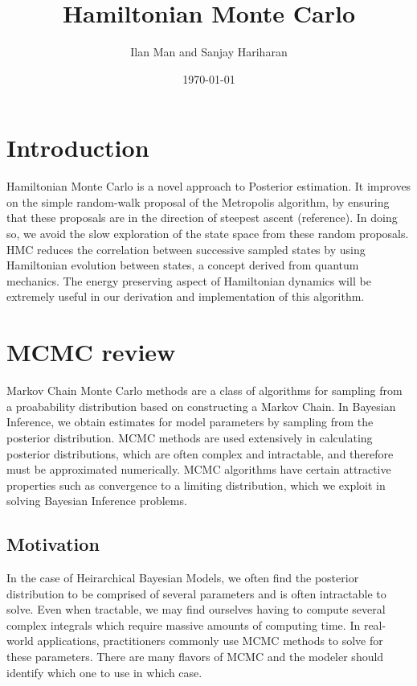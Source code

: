 \documentclass{article}
\title{Hamiltonian Monte Carlo}
\author{Ilan Man and Sanjay Hariharan}
\date{\today}
\begin{document}
\maketitle

\section{Introduction}


Hamiltonian Monte Carlo is a novel approach to Posterior estimation. It improves on the simple random-walk proposal of the Metropolis algorithm, by ensuring that these proposals are in the direction of steepest ascent (reference). In doing so, we avoid the slow exploration of the state space from these random proposals. HMC reduces the correlation between successive sampled states by using Hamiltonian evolution between states, a concept derived from quantum mechanics. The energy preserving aspect of Hamiltonian dynamics will be extremely useful in our derivation and implementation of this algorithm.

\section{MCMC review}

Markov Chain Monte Carlo methods are a class of algorithms for sampling from a proabability distribution based on constructing a Markov Chain. In Bayesian Inference, we obtain estimates for model parameters by sampling from the posterior distribution. MCMC methods are used extensively in calculating posterior distributions, which are often complex and intractable, and therefore must be approximated numerically. MCMC algorithms have certain attractive properties such as convergence to a limiting distribution, which we exploit in solving Bayesian Inference problems.

\subsection{Motivation}

In the case of Heirarchical Bayesian Models, we often find the posterior distribution to be comprised of several parameters and is often intractable to solve. Even when tractable, we may find ourselves having to compute several complex integrals which require massive amounts of computing time. In real-world applications, practitioners commonly use MCMC methods to solve for these parameters. There are many flavors of MCMC and the modeler should identify which one to use in which case.
\end{document}
